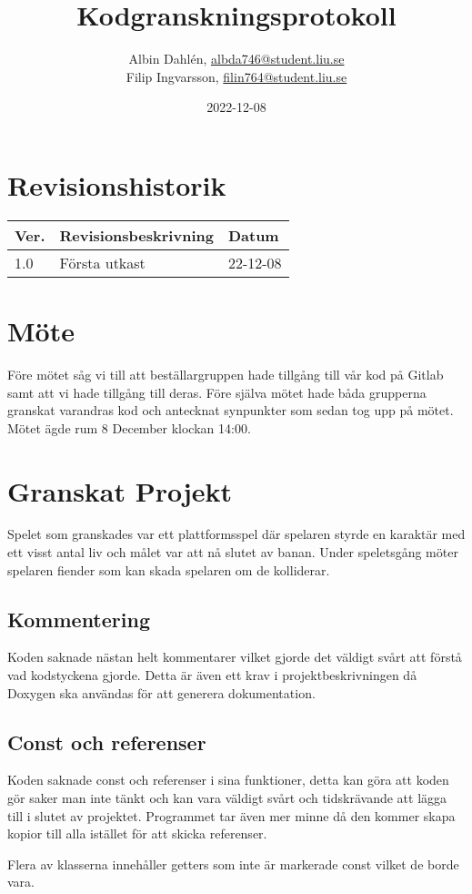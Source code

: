 \documentclass{TDP005mall}
\author{Albin Dahlén, \url{albda746@student.liu.se}\\
  Filip Ingvarsson, \url{filin764@student.liu.se}}
\title{Kodgranskningsprotokoll}
\date{2022-12-08}
\begin{document}
\projectpage
\section{Revisionshistorik}
\begin{table}[!h]
\begin{tabularx}{\linewidth}{|l|X|l|}
\hline
Ver. & Revisionsbeskrivning & Datum \\\hline
1.0 & Första utkast & 22-12-08 \\\hline
\end{tabularx}
\end{table}

\section{Möte}
Före mötet såg vi till att beställargruppen hade tillgång till vår kod på Gitlab samt att vi hade tillgång till deras.
Före själva mötet hade båda grupperna granskat varandras kod och antecknat synpunkter som sedan tog upp på mötet.
Mötet ägde rum 8 December klockan 14:00.

\section{Granskat Projekt}
Spelet som granskades var ett plattformsspel där spelaren styrde en karaktär med ett visst antal liv och målet var att nå slutet av banan.
Under speletsgång möter spelaren fiender som kan skada spelaren om de kolliderar.

\subsection{Kommentering}
Koden saknade nästan helt kommentarer vilket gjorde det väldigt svårt att förstå vad kodstyckena gjorde.
Detta är även ett krav i projektbeskrivningen då Doxygen ska användas för att generera dokumentation.

\subsection{Const och referenser}
Koden saknade const och referenser i sina funktioner, detta kan göra att koden gör saker man inte tänkt och kan vara väldigt svårt och tidskrävande att lägga till i slutet av projektet. 
Programmet tar även mer minne då den kommer skapa kopior till alla istället för att skicka referenser.

Flera av klasserna innehåller getters som inte är markerade const vilket de borde vara.
\end{document}
